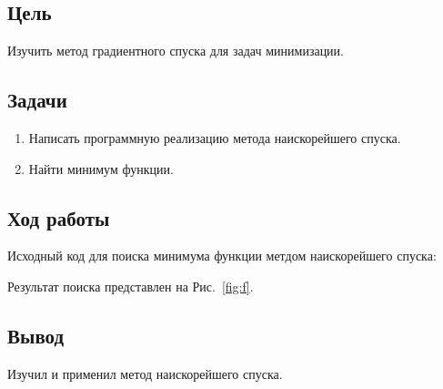 


    
\newcommand{\labn}{7}


\subsection*{Цель}

Изучить метод градиентного спуска для задач минимизации.

\subsection*{Задачи}

\begin{enumerate}
    \item Написать программную реализацию метода наискорейшего спуска.
    \item Найти минимум функции.
\end{enumerate}

\subsection*{Ход работы}

Исходный код для поиска минимума функции метдом наискорейшего спуска:

Результат поиска представлен на Рис.~\ref{fig:f}.

\subsection*{Вывод}

Изучил и применил метод наискорейшего спуска.


